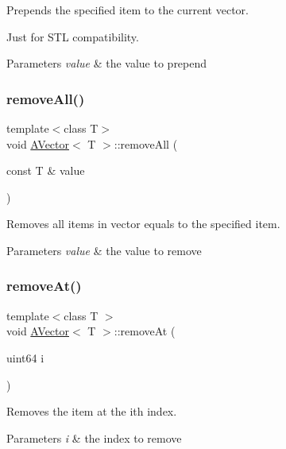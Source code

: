 Prepends the specified item to the current vector. 

Just for S\+TL compatibility.


\begin{DoxyParams}{Parameters}
{\em value} & the value to prepend \\
\hline
\end{DoxyParams}
\mbox{\label{class_a_vector_a521f435b2b3c74c92d6cbe94bc3faddd}} 
\subsubsection{\texorpdfstring{removeAll()}{removeAll()}}
{\footnotesize\ttfamily template$<$class T$>$ \\
void \mbox{\hyperlink{class_a_vector}{A\+Vector}}$<$ T $>$\+::remove\+All (\begin{DoxyParamCaption}\item[{const T \&}]{value }\end{DoxyParamCaption})}



Removes all items in vector equals to the specified item. 


\begin{DoxyParams}{Parameters}
{\em value} & the value to remove \\
\hline
\end{DoxyParams}
\mbox{\label{class_a_vector_ae3b650535e5a248a385988887064868e}} 
\subsubsection{\texorpdfstring{removeAt()}{removeAt()}}
{\footnotesize\ttfamily template$<$class T $>$ \\
void \mbox{\hyperlink{class_a_vector}{A\+Vector}}$<$ T $>$\+::remove\+At (\begin{DoxyParamCaption}\item[{uint64}]{i }\end{DoxyParamCaption})}



Removes the item at the ith index. 


\begin{DoxyParams}{Parameters}
{\em i} & the index to remove \\
\hline
\end{DoxyParams}
\mbox{\label{class_a_vector_a33f1e98af680a5c9e430dc11beeb4dd8}} 
